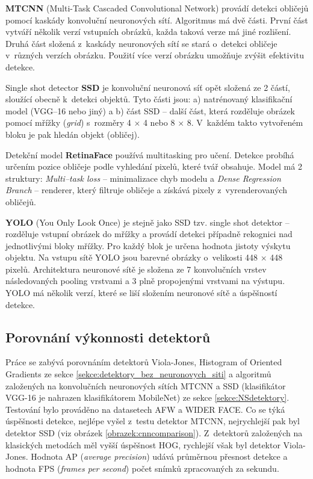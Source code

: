 \textbf{MTCNN} (Multi-Task Cascaded Convolutional Network) \cite{fdCNNComparison, mtcnn} provádí detekci obličejů pomocí kaskády konvoluční neuronových sítí. Algoritmus má dvě části. První část vytváří několik verzí vstupních obrázků, každa taková verze má jiné rozlišení. Druhá část složená z~kaskády neuronových sítí se stará o~detekci obličeje v~různých verzích obrázku. Použití více verzí obrázku umožňuje zvýšit efektivitu detekce.

Single shot detector \textbf{SSD} \cite{ssd} je konvoluční neuronová síť opět složená ze 2 částí, sloužící obecně k~detekci objektů. Tyto části jsou: a) natrénovaný klasifikační model (VGG--16 nebo jiný) a b) část SSD -- další část, která rozděluje obrázek pomocí mřížky (\emph{grid}) s~rozměry 4 $\times$ 4 nebo 8 $\times$ 8. V~každém takto vytvořeném bloku je pak hledán objekt (obličej).

Detekční model \textbf{RetinaFace} \cite{lowLightFdReview} používá multitasking pro učení. Detekce probíhá určením pozice obličeje podle vyhledání pixelů, které tvář obsahuje. Model má 2 struktury: \emph{Multi--task loss} -- minimalizace chyb modelu a \emph{Dense Regression Branch} -- renderer, který filtruje obličeje a získává pixely z~vyrenderovaných obličejů.

\textbf{YOLO} (You Only Look Once) \cite{yolo} je stejně jako SSD tzv. single shot detektor -- rozděluje vstupní obrázek do mřížky a provádí detekci případně rekognici nad jednotlivými bloky mřížky. Pro každý blok je určena hodnota jistoty výskytu objektu. Na vstupu sítě YOLO jsou barevné obrázky o~velikosti 448 $\times$ 448 pixelů. Architektura neuronové sítě je složena ze 7 konvolučních vrstev následovaných pooling vrstvami a 3 plně propojenými vrstvami na výstupu.
YOLO má několik verzí, které se liší složením neuronové sítě a úspěšností detekce.

\subsection*{Porovnání výkonnosti detektorů}
Práce \cite{fdCNNComparison} se zabývá porovnáním detektorů Viola-Jones, Histogram of Oriented Gradients ze sekce \ref{sekce:detektory_bez_neuronovych_siti} a algoritmů založených na konvolučních neuronových sítích MTCNN a SSD (klasifikátor VGG-16 je nahrazen klasifikátorem MobileNet) ze sekce \ref{sekce:NSdetektory}. Testování bylo prováděno na datasetech AFW a WIDER FACE. Co se týká úspěšnosti detekce, nejlépe vyšel z~testu detektor MTCNN, nejrychlejší pak byl detektor SSD (viz obrázek \ref{obrazek:cnncomparison}). Z~detektorů založených na klasických metodách měl vyšší úspěšnost HOG, rychlejší však byl detektor Viola-Jones. Hodnota AP (\emph{average precision}) udává průměrnou přesnost detekce a hodnota FPS (\emph{frames per second}) počet snímků zpracovaných za sekundu.

